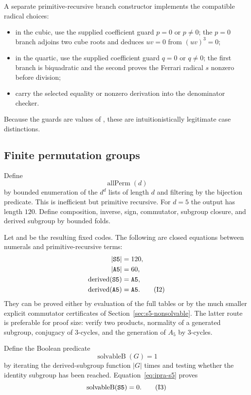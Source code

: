 A separate primitive-recursive branch constructor implements the compatible
radical choices:

\begin{itemize}
\item in the cubic, use the supplied coefficient guard $p=0$ or $p\ne0$;
  the $p=0$ branch adjoins two cube roots and deduces $uv=0$ from
  $(uv)^3=0$;
\item in the quartic, use the supplied coefficient guard $q=0$ or $q\ne0$;
  the first branch is biquadratic and the second proves the Ferrari radical
  $s$ nonzero before division;
\item carry the selected equality or nonzero derivation into the denominator
  checker.
\end{itemize}

Because the guards are values of , these are intuitionistically
legitimate case distinctions.

\subsection{Finite permutation groups}

Define
\[
 \operatorname{allPerm}(d)
\]
by bounded enumeration of the $d^d$ lists of length $d$ and filtering by the
bijection predicate.  This is inefficient but primitive recursive.  For
$d=5$ the output has length $120$.  Define composition, inverse, sign,
commutator, subgroup closure, and derived subgroup by bounded folds.

Let  and  be the resulting fixed codes.  The following are
closed equations between numerals and primitive-recursive terms:
\begin{align}
 |\code{S5}|&=120,\\
 |\code{A5}|&=60,\\
 \operatorname{derived}(\code{S5})&=\code{A5},\\
 \operatorname{derived}(\code{A5})&=\code{A5}.
 \tag{I2}\label{eq:ipra-s5}
\end{align}
They can be proved either by evaluation of the full tables or by the much
smaller explicit commutator certificates of Section~\ref{sec:s5-nonsolvable}.
The latter route is preferable for proof size: verify two products, normality
of a generated subgroup, conjugacy of $3$-cycles, and the generation of $A_5$
by $3$-cycles.

Define the Boolean predicate
\[
 \operatorname{solvableB}(G)=1
\]
by iterating the derived-subgroup function $|G|$ times and testing whether the
identity subgroup has been reached.  Equation~\eqref{eq:ipra-s5} proves
\[
 \operatorname{solvableB}(\code{S5})=0.
 \tag{I3}\label{eq:S5-bool-false}
\]

